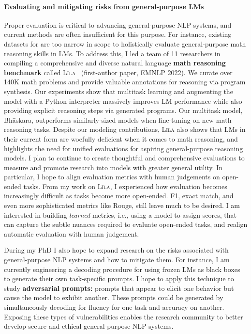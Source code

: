 \documentclass[11pt]{article}
\newcommand\lila{\textsc{L\={\i}la}\xspace}
\begin{document}
\paragraph{Evaluating and mitigating risks from general-purpose LMs}
Proper evaluation is critical to advancing general-purpose NLP systems,
and current methods are often insufficient for this purpose.
For instance, existing datasets for are too narrow in scope 
to holistically evaluate general-purpose math reasoning skills in LMs.
To address this,
I led a team of 11 researchers in compiling a
comprehensive and diverse natural language 
\textbf{math reasoning benchmark} 
called \lila~\cite{Mishra2022LilaAU} (first-author paper, EMNLP 2022).
We curate over 140K math problems
and provide valuable annotations for reasoning via program synthesis. 
Our experiments show that multitask learning 
and augmenting the model with a Python interpreter
massively improves LM performance 
while also providing explicit reasoning steps via generated programs.
Our multitask model, Bh\=askara, 
outperforms similarly-sized models
when fine-tuning on new math reasoning tasks.
Despite our modeling contributions, \lila also shows that LMs 
in their current form 
are woefully deficient when it comes to math reasoning,
and highlights the need for unified evaluations for 
aspiring general-purpose reasoning models.
I plan to continue to create thoughtful and comprehensive evaluations 
to measure and promote research into models with greater general utility.
In particular, I hope to align evaluation metrics
with human judgements on open-ended tasks. 
From my work on \lila, 
I experienced how evaluation becomes increasingly difficult 
as tasks become more open-ended.
F1, exact match, and even more sophisticated metrics like Rouge,
still leave much to be desired.
I am interested in building \emph{learned} metrics, 
i.e., using a model to assign scores,
that can capture the subtle nuances required to evaluate open-ended tasks,
and realign automatic evaluation with human judgement.

During my PhD I also hope to expand research on the risks associated 
with general-purpose NLP systems and how to mitigate them.
For instance, I am currently engineering a decoding procedure 
for using frozen LMs as black boxes
to generate their own task-specific prompts.
I hope to apply this technique
to study \textbf{adversarial prompts:}
prompts that appear to elicit one behavior 
but cause the model to exhibit another.
These prompts could be generated by simultaneously 
decoding for fluency for one task and accuracy on another.
Exposing these types of vulnerabilities
enables the research community to better develop
secure and ethical general-purpose NLP systems. 
\end{document}
